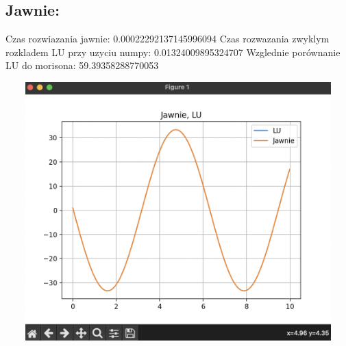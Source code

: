 \documentclass[12pt]{article}
\begin{document}
\subsection{Jawnie:}
\begin{center}
    Czas rozwiazania jawnie: 0.00022292137145996094
    \newline\newline
    Czas rozwazania zwyklym rozkladem LU przy uzyciu numpy: 0.01324009895324707
    \newline\newline
    Wzglednie porównanie LU do morisona: 59.39358288770053
\end{center}
\includegraphics[width=15cm,height=10cm, keepaspectratio]{wykres_jawnie}
\end{document}
